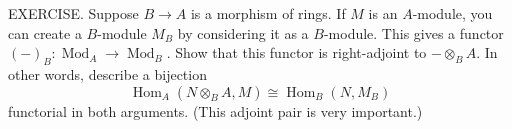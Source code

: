 EXERCISE. Suppose $B\to A$ is a morphism of rings. If $M$ is an $A$-module, you can create a $B$-module $M_B$ by considering it as a $B$-module. This gives a functor $(-)_B:\operatorname{Mod}_A\to\operatorname{Mod}_B$. Show that this functor is right-adjoint to $-\otimes_B A$. In other words, describe a bijection
$$\operatorname{Hom}_A(N\otimes_B A,M)\cong\operatorname{Hom}_B(N,M_B)$$
functorial in both arguments. (This adjoint pair is very important.)
